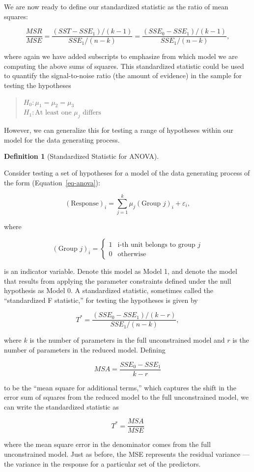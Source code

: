 \documentclass[
  letterpaper,
  DIV=11,
  numbers=noendperiod]{scrreprt}
\theoremstyle{definition}
\newtheorem{definition}{Definition}[chapter]
\theoremstyle{definition}
\theoremstyle{plain}
\theoremstyle{remark}
\begin{document}
We are now ready to define our standardized statistic as the ratio of
mean squares:

\[\frac{MSR}{MSE} = \frac{\left(SST - SSE_1\right)/(k - 1)}{SSE_1 / (n - k)} = \frac{\left(SSE_0 - SSE_1\right)/(k - 1)}{SSE_1 / (n - k)},\]

where again we have added subscripts to emphasize from which model we
are computing the above sums of squares. This standardized statistic
could be used to quantify the signal-to-noise ratio (the amount of
evidence) in the sample for testing the hypotheses

\begin{quote}
\(H_0: \mu_1 = \mu_2 = \mu_3\)\\
\(H_1: \text{At least one } \mu_j \text{ differs}\)
\end{quote}

However, we can generalize this for testing a range of hypotheses within
our model for the data generating process.

\begin{definition}[Standardized Statistic for
ANOVA]\protect\hypertarget{def-anova-f}{}\label{def-anova-f}

Consider testing a set of hypotheses for a model of the data generating
process of the form (Equation~\ref{eq-anova}):

\[(\text{Response})_i = \sum_{j=1}^{k} \mu_j(\text{Group } j)_i + \varepsilon_i,\]

where

\[(\text{Group } j)_i = \begin{cases} 1 & \text{i-th unit belongs to group } j \\ 0 & \text{otherwise} \end{cases}\]

is an indicator variable. Denote this model as Model 1, and denote the
model that results from applying the parameter constraints defined under
the null hypothesis as Model 0. A standardized statistic, sometimes
called the ``standardized F statistic,'' for testing the hypotheses is
given by

\[T^* = \frac{\left(SSE_0 - SSE_1\right) / (k - r)}{SSE_1 / (n - k)},\]

where \(k\) is the number of parameters in the full unconstrained model
and \(r\) is the number of parameters in the reduced model. Defining

\[MSA = \frac{SSE_0 - SSE_1}{k - r}\]

to be the ``mean square for additional terms,'' which captures the shift
in the error sum of squares from the reduced model to the full
unconstrained model, we can write the standardized statistic as

\[T^* = \frac{MSA}{MSE}\]

where the mean square error in the denominator comes from the full
unconstrained model. Just as before, the MSE represents the residual
variance --- the variance in the response for a particular set of the
predictors.

\end{definition}
\end{document}
